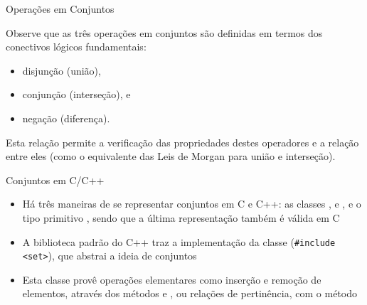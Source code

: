 \begin{frame}[fragile]{Operações em Conjuntos}

Observe que as três operações em conjuntos são definidas em termos dos conectivos lógicos fundamentais: 

    \begin{itemize}
        \item disjunção (união),
        \item conjunção (interseção), e
        \item negação (diferença).
    \end{itemize}

\vspace{0.2in}

Esta relação permite a verificação das propriedades destes operadores e a relação entre eles (como o equivalente das Leis de Morgan para união e interseção).

\end{frame}

\begin{frame}[fragile]{Conjuntos em C/C++}

    \begin{itemize}
        \item Há três maneiras de se representar conjuntos em C e C++: as classes ,  e , e o tipo primitivo 
            , sendo que a última representação também é válida em C

        \item A biblioteca padrão do C++ traz a implementação da classe  (\texttt{#include <set>}), que abstrai a ideia de conjuntos

        \item Esta classe provê operações elementares como inserção e remoção de elementos, através dos métodos  e , ou
            relações de pertinência, com o método 
    \end{itemize}

\end{frame}

